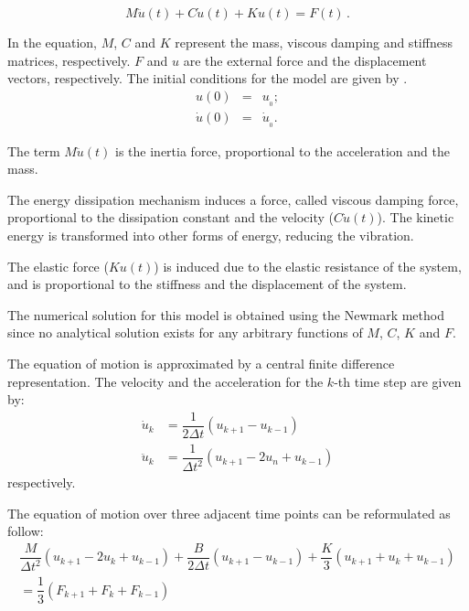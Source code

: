 \begin{equation}
\label{eq:dynamic}
{M}\ddot{u}(t) + {C}\dot{u}(t) + {K} {u}(t) = {F}(t)\,.
\end{equation}

In the equation, $M$, $C$ and $K$ represent the mass, viscous damping and stiffness matrices, respectively. $F$ and $u$ are the external force and the displacement vectors, respectively. The initial conditions for the model are given by .
%
\begin{eqnarray}
\label{eq:ic1}
u(0) &=& u_{_0};\\
\label{eq:ic2}
\dot{u}(0) &=& \dot{u}_{_0}.
\end{eqnarray}

The term ${M}\ddot{u}(t)$ is the inertia force, proportional to the acceleration and the mass.

The energy dissipation mechanism induces a force, called viscous damping force, proportional to the dissipation constant and the velocity (${C}\dot{u}(t)$). The kinetic energy is transformed into other forms of energy, reducing the vibration.

The elastic force (${K} {u}(t)$) is induced due to the elastic resistance of the system, and is proportional to the stiffness and the displacement of the system.

The numerical solution for this model is obtained using the Newmark method \cite{newmark1959method} since no analytical solution exists for any arbitrary functions of $M$, $C$, $K$ and $F$.

The equation of motion is approximated by a central finite difference representation. The velocity and the acceleration for the $k$-th time step are given by:
%
\begin{align}
    \dot{u}_k &= \dfrac{1}{2\Delta t} \left( u_{k+1} - u_{k-1} \right) \\
    \ddot{u}_k &= \dfrac{1}{\Delta t^2} \left( u_{k+1} - 2 u_n + u_{k-1} \right)
\end{align}
%
respectively.

The equation of motion over three adjacent time points can be reformulated as follow:
%
\begin{multline}
    \dfrac{M}{\Delta t^2} \left( u_{k+1} - 2 u_k + u_{k-1} \right) + \dfrac{B}{2\Delta t} \left( u_{k+1} - u_{k-1} \right)  + \dfrac{K}{3} \left( u_{k+1} + u_k + u_{k-1} \right) \\
    = \dfrac{1}{3} \left( F_{k+1} + F_k + F_{k-1} \right)
\end{multline}

